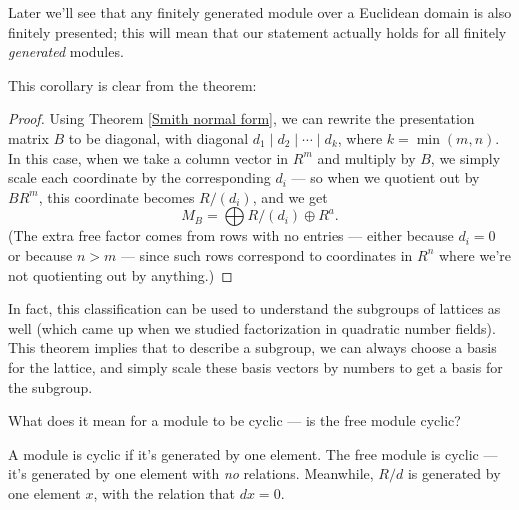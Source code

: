 Later we'll see that any finitely generated module over a Euclidean domain is also finitely presented; this will mean that our statement actually holds for all finitely \emph{generated} modules. 

This corollary is clear from the theorem:

\begin{proof}
Using Theorem \ref{Smith normal form}, we can rewrite the presentation matrix $B$ to be diagonal, with diagonal $d_1 \mid d_2 \mid \cdots \mid d_k$, where $k = \min(m, n)$. In this case, when we take a column vector in $R^m$ and multiply by $B$, we simply scale each coordinate by the corresponding $d_i$ --- so when we quotient out by $BR^m$, this coordinate becomes $R/(d_i)$, and we get \[M_B = \bigoplus R/(d_i) \oplus R^a.\] (The extra free factor comes from rows with no entries --- either because $d_i = 0$ or because $n > m$ --- since such rows correspond to coordinates in $R^n$ where we're not quotienting out by anything.)
\end{proof}




In fact, this classification can be used to understand the subgroups of lattices as well (which came up when we studied factorization in quadratic number fields). This theorem implies that to describe a subgroup, we can always choose a basis for the lattice, and simply scale these basis vectors by numbers to get a basis for the subgroup. 

\begin{question}
What does it mean for a module to be cyclic --- is the free module cyclic? 
\end{question}

\begin{ans}
A module is cyclic if it's generated by one element. The free module is cyclic --- it's generated by one element with \emph{no} relations. Meanwhile, $R/d$ is generated by one element $x$, with the relation that $dx = 0$. 
\end{ans}

